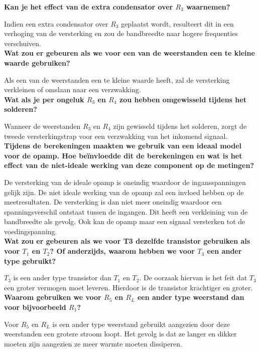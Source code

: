 \documentclass{report}
\begin{document}
\noindent \textbf{Kan je het effect van de extra condensator over $R_3$ waarnemen?} 

\noindent Indien een extra condensator over $R_{3}$ geplaatst wordt, resulteert dit in een verhoging van de versterking en zou de bandbreedte naar hogere frequenties verschuiven. \\

\noindent \textbf{Wat zou er gebeuren als we voor een van de weerstanden een te kleine waarde gebruiken?} 

\noindent Als een van de weerstanden een te kleine waarde heeft, zal de versterking verkleinen of omslaan naar een verzwakking. \\

\noindent \textbf{Wat als je per ongeluk $R_3$ en $R_4$ zou hebben omgewisseld tijdens het solderen?}

\noindent Wanneer de weerstanden $R_{3}$ en $R_{4}$ zijn gewisseld tijdens het solderen, zorgt de tweede versterkingstrap voor een verzwakking van het inkomend signaal. \\

\noindent \textbf{Tijdens de berekeningen maakten we gebruik van een ideaal model voor de opamp. Hoe beïnvloedde dit de berekeningen en wat is het effect van de niet-ideale
werking van deze component op de metingen?} 

\noindent De versterking van de ideale opamp is oneindig waardoor de ingansspanningen gelijk zijn. De niet ideale werking van de opamp zal een invloed hebben op de meetresultaten. De versterking is dan niet meer oneindig waardoor een spanningsverschil ontstaat tussen de ingangen. Dit heeft een verkleining van de bandbreedte als gevolg. Ook kan de opamp maar een signaal versterken tot de voedingspanning. \\

\noindent \textbf{Wat zou er gebeuren als we voor T3 dezelfde transistor gebruiken als voor $T_1$ en $T_2$? Of anderzijds, waarom hebben we voor $T_3$ een ander type gebruikt?}
 
\noindent $T_{3}$ is een ander type transistor dan $T_{1}$ en $T_{2}$. De oorzaak hiervan is het feit dat $T_{3}$ een groter vermogen moet leveren. Hierdoor is de transistor krachtiger en groter. \\

\newpage 
\noindent \textbf{Waarom gebruiken we voor $R_5$ en $R_L$ een ander type weerstand dan voor bijvoorbeeld
$R_1$?}

\noindent Voor $R_{5}$ en $R_{L}$ is een ander type weerstand gebruikt aangezien door deze weerstanden een grotere stroom loopt. Het gevolg is dat ze langer en dikker moeten zijn aangezien ze meer warmte moeten dissiperen. \\
\end{document}
